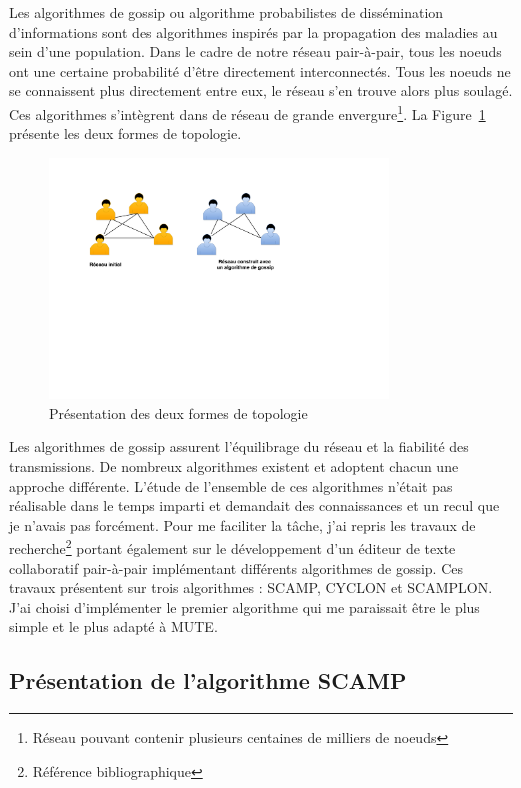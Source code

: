 \documentclass{tnreport}
\begin{document}
Les algorithmes de gossip ou algorithme probabilistes de dissémination d'informations sont des algorithmes inspirés par la propagation des maladies au sein d'une population. Dans le cadre de notre réseau pair-à-pair, tous les noeuds ont une certaine probabilité d'être directement interconnectés. Tous les noeuds ne se connaissent plus directement entre eux, le réseau s'en trouve alors plus soulagé. Ces algorithmes s'intègrent dans de réseau de grande envergure\footnote{Réseau pouvant contenir plusieurs centaines de milliers de noeuds}.  La Figure~\ref{fig:topo-comp} présente les deux formes de topologie.

\begin{figure}[!h]
  \centering
  \includegraphics[width=9cm]{figures/topo-comp}
  \caption{Présentation des deux formes de topologie}
  \label{fig:topo-comp}
\end{figure}

Les algorithmes de gossip assurent l'équilibrage du réseau et la fiabilité des transmissions. De nombreux algorithmes existent et adoptent chacun une approche différente. L'étude de l'ensemble de ces algorithmes n'était pas réalisable dans le temps imparti et demandait des connaissances et un recul que je n'avais pas forcément. Pour me faciliter la tâche, j'ai repris les travaux de recherche\footnote{Référence bibliographique\cite{SCAMPLON}} portant également sur le développement d'un éditeur de texte collaboratif pair-à-pair implémentant différents algorithmes de gossip. Ces travaux présentent sur trois algorithmes : SCAMP, CYCLON et SCAMPLON. J'ai choisi d'implémenter le premier algorithme qui me paraissait être le plus simple et le plus adapté à MUTE.

\subsection{Présentation de l'algorithme SCAMP}
\end{document}
